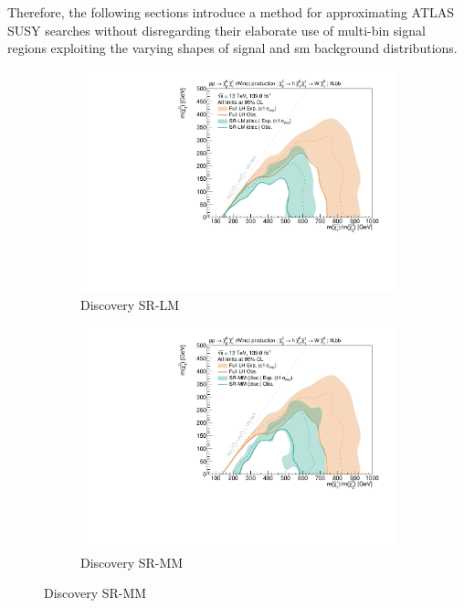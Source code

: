 Therefore, the following sections introduce a method for approximating ATLAS SUSY searches without disregarding their elaborate use of multi-bin signal regions exploiting the varying shapes of signal and \gls{sm} background distributions. 

\begin{figure}
	\centering
	\begin{subfigure}[b]{0.5\textwidth}
		\centering\includegraphics[width=\textwidth]{exclusion_1Lbb_SRLM_noLabel}
		\caption{Discovery SR-LM\label{fig:single_bin_SRLM}}
	\end{subfigure}\hfill
	\begin{subfigure}[b]{0.5\textwidth}
		\centering\includegraphics[width=\textwidth]{exclusion_1Lbb_SRMM_noLabel}
		\caption{Discovery SR-MM\label{fig:single_bin_SRMM}}
	\end{subfigure}\hfill

\end{figure}
